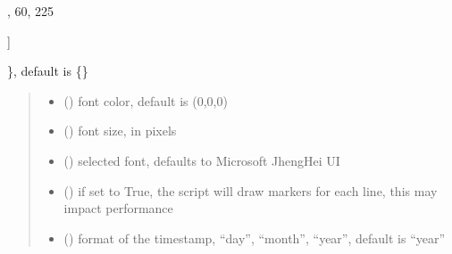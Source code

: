 \documentclass[letterpaper,10pt,english]{sphinxmanual}
\begin{document}
\begin{fulllineitems}
\begin{quote}
\begin{description}
\begin{itemize}
\end{itemize}

\end{description}\end{quote}
\begin{description}
\begin{description}
\sphinxlineitem{\{}\begin{description}
\sphinxlineitem{“United States”: {[}}
,
60,
225

\end{description}

\sphinxAtStartPar
{]}

\end{description}

\sphinxAtStartPar
\}, default is \{\}

\end{description}
\begin{quote}\begin{description}
\begin{itemize}
\item {} 
\sphinxAtStartPar
{} () \textendash{} font color, default is (0,0,0)

\item {} 
\sphinxAtStartPar
{} () \textendash{} font size, in pixels

\item {} 
\sphinxAtStartPar
{} () \textendash{} selected font, defaults to Microsoft JhengHei UI

\item {} 
\sphinxAtStartPar
{} () \textendash{} if set to True, the script will draw markers for each line, this may impact performance

\item {} 
\sphinxAtStartPar
{} () \textendash{} format of the timestamp, “day”, “month”, “year”, default is “year”


\end{itemize}
\end{description}
\end{quote}
\end{fulllineitems}
\end{document}
